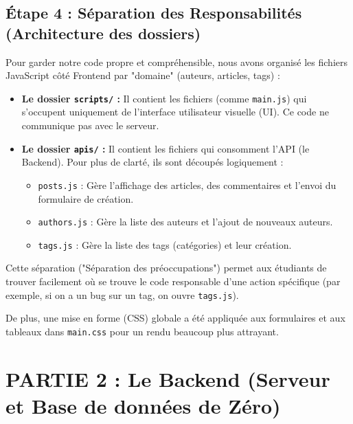 \subsection{Étape 4 : Séparation des Responsabilités (Architecture des dossiers)}
Pour garder notre code propre et compréhensible, nous avons organisé les fichiers JavaScript côté Frontend par "domaine" (auteurs, articles, tags) :
\begin{itemize}
    \item \textbf{Le dossier \texttt{scripts/} :} Il contient les fichiers (comme \texttt{main.js}) qui s'occupent uniquement de l'interface utilisateur visuelle (UI). Ce code ne communique pas avec le serveur.
    \item \textbf{Le dossier \texttt{apis/} :} Il contient les fichiers qui consomment l'API (le Backend). Pour plus de clarté, ils sont découpés logiquement :
    \begin{itemize}
        \item \texttt{posts.js} : Gère l'affichage des articles, des commentaires et l'envoi du formulaire de création.
        \item \texttt{authors.js} : Gère la liste des auteurs et l'ajout de nouveaux auteurs.
        \item \texttt{tags.js} : Gère la liste des tags (catégories) et leur création.
    \end{itemize}
\end{itemize}
Cette séparation ("Séparation des préoccupations") permet aux étudiants de trouver facilement où se trouve le code responsable d'une action spécifique (par exemple, si on a un bug sur un tag, on ouvre \texttt{tags.js}).

De plus, une mise en forme (CSS) globale a été appliquée aux formulaires et aux tableaux dans \texttt{main.css} pour un rendu beaucoup plus attrayant.

\newpage



\section{PARTIE 2 : Le Backend (Serveur et Base de données de Zéro)}

